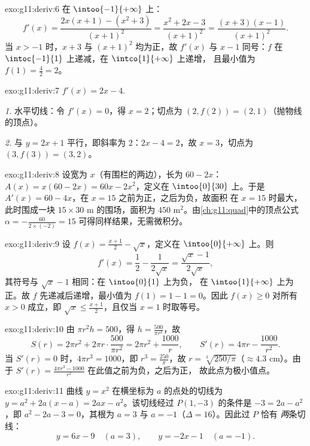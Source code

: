 \begin{solution}{exo:g11:deriv:6}
在 $\intoo{-1}{+\infty}$ 上：
\[
f'(x) = \frac{2x(x+1) - (x^2+3)}{(x+1)^2}
= \frac{x^2 + 2x - 3}{(x+1)^2}
= \frac{(x+3)(x-1)}{(x+1)^2}.
\]
当 $x > -1$ 时，$x + 3$ 与 $(x+1)^2$ 均为正，故 $f'(x)$ 与
$x - 1$ 同号：$f$ 在 $\intoc{-1}{1}$ 上递减，在 $\intco{1}{+\infty}$ 上递增，
且最小值为 $f(1) = \frac{4}{2} = 2$。
\end{solution}

\begin{solution}{exo:g11:deriv:7}
$f'(x) = 2x - 4$.

\emph{1.} 水平切线：令 $f'(x) = 0$，得 $x = 2$；切点为
$(2, f(2)) = (2, 1)$（抛物线的顶点）。

\emph{2.} 与 $y = 2x + 1$ 平行，即斜率为 $2$：$2x - 4 = 2$，故
$x = 3$，切点为 $(3, f(3)) = (3, 2)$。
\end{solution}

\begin{solution}{exo:g11:deriv:8}
设宽为 $x$（有围栏的两边），长为 $60 - 2x$：
$A(x) = x(60 - 2x) = 60x - 2x^2$，定义在 $\intoo{0}{30}$ 上。于是
$A'(x) = 60 - 4x$，在 $x = 15$ 之前为正，之后为负，故面积
在 $x = 15$ 时最大，此时围成一块 $15 \times 30$ m 的围场，面积为
$450$ m$^2$。由\cref{ch:g11:quad}中的顶点公式
$\alpha = -\frac{60}{2 \times (-2)} = 15$ 可得同样结果，无需微积分。
\end{solution}

\begin{solution}{exo:g11:deriv:9}
设 $f(x) = \frac{x+1}{2} - \sqrt x$，定义在 $\intoo{0}{+\infty}$ 上。则
\[
f'(x) = \frac12 - \frac{1}{2\sqrt x} = \frac{\sqrt x - 1}{2\sqrt x},
\]
其符号与 $\sqrt x - 1$ 相同：在 $\intoo{0}{1}$ 上为负，
在 $\intoo{1}{+\infty}$ 上为正。故 $f$ 先递减后递增，最小值为
$f(1) = 1 - 1 = 0$。因此 $f(x) \geq 0$ 对所有 $x > 0$ 成立，即
$\sqrt x \leq \frac{x+1}{2}$，且仅当 $x = 1$ 时取等号。
\end{solution}

\begin{solution}{exo:g11:deriv:10}
由 $\pi r^2 h = 500$，得 $h = \frac{500}{\pi r^2}$，故
\[
S(r) = 2\pi r^2 + 2\pi r \cdot \frac{500}{\pi r^2}
= 2\pi r^2 + \frac{1000}{r},
\qquad
S'(r) = 4\pi r - \frac{1000}{r^2}.
\]
当 $S'(r) = 0$ 时，$4\pi r^3 = 1000$，即 $r^3 = \frac{250}{\pi}$，故
$r = \sqrt[3]{250/\pi}$（$\approx 4.3$ cm）。由于 $S'(r) =
\frac{4\pi r^3 - 1000}{r^2}$ 在此值之前为负，之后为正，
故此点为极小值点。
\end{solution}

\begin{solution}{exo:g11:deriv:11}
曲线 $y = x^2$ 在横坐标为 $a$ 的点处的切线为
$y = a^2 + 2a(x - a) = 2ax - a^2$。该切线经过 $P(1, -3)$ 的条件是
$-3 = 2a - a^2$，即 $a^2 - 2a - 3 = 0$，其根为 $a = 3$ 与
$a = -1$（$\Delta = 16$）。因此过
$P$ 恰有 \emph{两}条切线：
\[
y = 6x - 9 \quad (a = 3),
\qquad
y = -2x - 1 \quad (a = -1).
\]
\end{solution}

